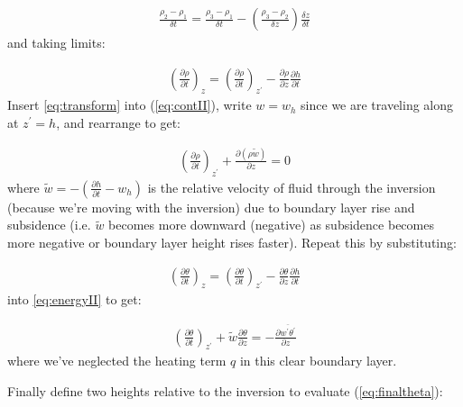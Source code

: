 \documentclass[12pt]{article}
\begin{document}
\begin{gather}
  \frac{ \rho_2 - \rho_ 1}{ \delta t} =\frac{\rho_3 - \rho_1 }{\delta t}  - \left (  \frac{\rho_3 - \rho_2 }{\delta z}  \right )
   \frac{\delta z }{\delta t} 
\end{gather}
and taking limits:

\begin{gather}
\label{eq:transform}
  \left (  \frac{ \partial \rho}{\partial t}  \right )_z = \left (  \frac{ \partial \rho}{\partial t}  \right )_{z^\prime}
  - \frac{ \partial \rho}{\partial z} \frac{\partial h }{\partial t } 
\end{gather}
Insert \eqref{eq:transform} into (\ref{eq:contII}), write $w=w_h$ since we are traveling along at $z^\prime=h$, and
rearrange to get:

\begin{gather}
  \label{eq:transII}
\left (  \frac{ \partial \rho}{\partial t}  \right )_{z^\prime} + \frac{ \partial ( \rho \widetilde{w}) }{\partial z} =0
\end{gather}
where $\widetilde{w} = - \left (   \frac{ \partial h}{\partial t} - w_h  \right )$
is the relative velocity of fluid through the inversion (because we're moving with the inversion) due to
boundary layer rise and subsidence (i.e. $\widetilde{w}$ becomes more downward (negative) as subsidence becomes more negative or
boundary layer height rises faster).    Repeat this by substituting:

\begin{gather}
\label{eq:transformIII}
  \left (  \frac{ \partial \theta}{\partial t}  \right )_z = \left (  \frac{ \partial \theta}{\partial t}  \right )_{z^\prime}
  - \frac{ \partial \theta }{\partial z} \frac{\partial h }{\partial t } 
\end{gather}
into \eqref{eq:energyII} to get:

\begin{gather}
  \label{eq:finaltheta}
\left (  \frac{ \partial \theta}{\partial t}  \right )_{z^\prime} + \widetilde{w} \frac{ \partial  \theta}{\partial z}  
= - \frac{ \partial \overline{ w^\prime \theta^\prime}}{\partial z} 
\end{gather}
where we've neglected the heating term $q$ in this clear boundary layer.

Finally define two heights relative to the inversion to evaluate 
(\ref{eq:finaltheta}):  
\end{document}
